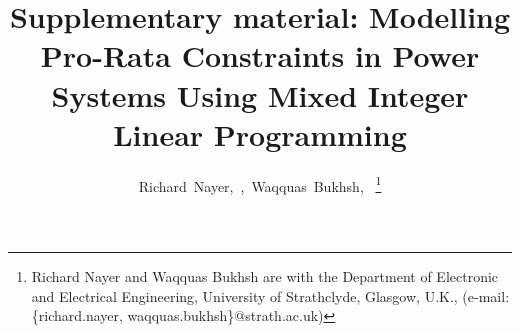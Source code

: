 \documentclass[lettersize,journal]{IEEEtran}
\begin{document}
\title{Supplementary material: Modelling Pro-Rata Constraints in Power Systems Using Mixed Integer Linear Programming}


\author{Richard~Nayer,~,~Waqquas~Bukhsh,~
\thanks{Richard Nayer and Waqquas Bukhsh are with the Department of Electronic and Electrical Engineering, University of Strathclyde, Glasgow, U.K., (e-mail:\{richard.nayer, waqquas.bukhsh\}@strath.ac.uk) }%
}





\maketitle
{}
\end{document}
